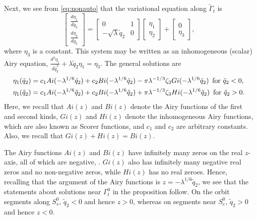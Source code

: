 \documentclass[11pt]{article}
\numberwithin{equation}{section}
\begin{document}
Next, we see from \eqref{eq:nonauto} that the variational equation along $\tilde{\Gamma}_t$ is
\begin{equation*}
    \left[
    \begin{array}{c} 
    \frac{d\eta_1}{d\tilde{q}_2} \\
    \frac{d\eta_2}{d\tilde{q}_2}
    \end{array}
    \right]
 = \left[
 \begin{array}{cc}
0 & 1 \\
-\sqrt{\lambda} \tilde{q}_2 & 0 
 \end{array}
 \right]
\left[ 
\begin{array}{c}
\eta_1 \\
\eta_2
\end{array}
\right]
+ \left[
\begin{array}{c}
0 \\
\eta_3
\end{array}
\right], 
\end{equation*}
where $\eta_3$ is a constant.
This system may be written as an inhomogeneous (scalar) Airy equation,
$\frac{d^2\eta_1}{d\tilde{q}_2^2} + \lambda \tilde{q}_2 \eta_1 = \eta_3$.
The general solutions are
\begin{equation}\label{eq:solutions-eov}
\begin{split}
    \eta_1(\tilde{q}_2) 
    &= c_1 Ai(-\lambda^{1/6}\tilde{q}_2)
    + c_2 Bi(-\lambda^{1/6}\tilde{q}_2)
    - \pi \lambda^{-1/3} \zeta_3 Gi(-\lambda^{1/6}\tilde{q}_2) \, \, \, {\rm for} \, \, \tilde{q}_2<0, \\
    \eta_1(\tilde{q}_2) 
    &= c_1 Ai(-\lambda^{1/6}\tilde{q}_2)
    + c_2 Bi(-\lambda^{1/6}\tilde{q}_2)
    + \pi \lambda^{-1/3} \zeta_3 Hi(-\lambda^{1/6}\tilde{q}_2) \, \, \, {\rm for} \, \, \tilde{q}_2>0. 
\end{split}
\end{equation}
%
Here, we recall that $Ai(z)$ and $Bi(z)$ denote the Airy functions of the first and second kinds, $Gi(z)$ and $Hi(z)$ denote the inhomogeneous Airy functions, which are also known as Scorer functions, and $c_1$ and $c_2$ are arbitrary constants. Also, we recall that $Gi(z)+Hi(z) = Bi(z)$.

The Airy functions $Ai(z)$ and $Bi(z)$ have infinitely many zeros on the real $z$-axis, all of which are negative, \cite{DLMF}.
$Gi(z)$ also has infinitely many negative real zeros and no non-negative zeros,
while $Hi(z)$ has no real zeroes.
Hence, recalling that the argument of the Airy functions is $z=-\lambda^{1/6} \tilde{q}_2$, we see that the statements about solutions near $\Gamma_t^0$ in the proposition follow. 
On the orbit segments along $S_s^0$, $\tilde{q}_2<0$ and hence $z>0$,
whereas on segments near $S_c^0$, $\tilde{q}_2>0$ and hence $z<0$.
\end{document}
